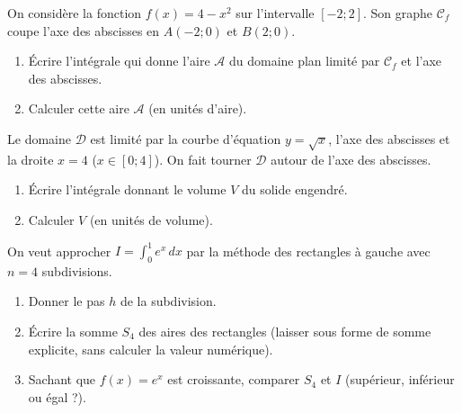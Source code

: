 \documentclass[11pt]{article}
\begin{document}
\begin{exercice}
On considère la fonction $f(x) = 4 - x^2$ sur l'intervalle $[-2;2]$. Son graphe $\mathcal{C}_f$ coupe l'axe des abscisses en $A(-2;0)$ et $B(2;0)$.
\begin{enumerate}
    \item Écrire l'intégrale qui donne l'aire $\mathcal{A}$ du domaine plan limité par $\mathcal{C}_f$ et l'axe des abscisses.
    \item Calculer cette aire $\mathcal{A}$ (en unités d'aire).
\end{enumerate}
\end{exercice}

\begin{exercice}
Le domaine $\mathcal{D}$ est limité par la courbe d'équation $y = \sqrt{x}$, l'axe des abscisses et la droite $x=4$ ($x \in [0;4]$). On fait tourner $\mathcal{D}$ autour de l'axe des abscisses.
\begin{enumerate}
    \item Écrire l'intégrale donnant le volume $V$ du solide engendré.
    \item Calculer $V$ (en unités de volume).
\end{enumerate}
\end{exercice}

\begin{exercice}
On veut approcher $I = \int_{0}^{1} e^x \, dx$ par la méthode des rectangles à gauche avec $n=4$ subdivisions.
\begin{enumerate}
    \item Donner le pas $h$ de la subdivision.
    \item Écrire la somme $S_4$ des aires des rectangles (laisser sous forme de somme explicite, sans calculer la valeur numérique).
    \item Sachant que $f(x)=e^x$ est croissante, comparer $S_4$ et $I$ (supérieur, inférieur ou égal ?).
\end{enumerate}
\end{exercice}
\end{document}
